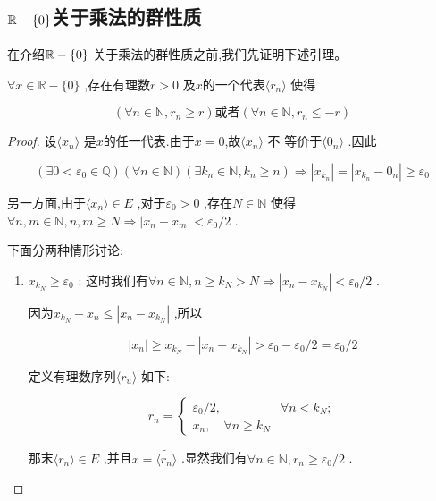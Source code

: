 \subsection{$\mathbb{R}-\{0\}$关于乘法的群性质}

在介绍\(\mathbb{R} - \{0\}\) 关于乘法的群性质之前,我们先证明下述引理。

\begin{mylemma*}{}

\(\forall x \in \mathbb{R} - \{0\}\) ,存在有理数$r > 0$ 及$x$的一个代表\(\langle r_n \rangle\) 使得

\[(\forall n \in \mathbb{N}, r_n \geqslant r) \text{或者} (\forall n \in \mathbb{N}, r_n \leqslant -r)\]

\end{mylemma*}


\begin{proof}

设\(\langle x_n \rangle\) 是$x$的任一代表.由于$x = 0$,故\(\langle x_n \rangle\) 不 等价于\(\langle 0_n \rangle\) .因此

\[(\exists 0 < \varepsilon_0 \in \mathbb{Q}) (\forall n \in \mathbb{N}) (\exists k_n \in \mathbb{N}, k_n \geqslant n) \Longrightarrow |x_{k_n}| = |x_{k_n} - 0_n| \geq \varepsilon_0 \]

另一方面,由于\(\langle x_n \rangle \in E\) ,对于\(\varepsilon_0 > 0\) ,存在\(N \in \mathbb{N}\) 使得\(\forall n, m \in \mathbb{N}, n, m \geqslant N \Longrightarrow |x_n - x_m| < \varepsilon_0 / 2\) .

下面分两种情形讨论:

\begin{enumerate}[label=\arabic*)]

\item \(x_{k_N} \geqslant \varepsilon_0\) : 这时我们有\(\forall n \in \mathbb{N}, n \geqslant k_N > N \Longrightarrow |x_n - x_{k_N}| < \varepsilon_0/2\) .

因为\(x_{k_N} - x_n \leqslant |x_n - x_{k_N}|\) ,所以

\[|x_n| \ge x_{k_N} - |x_n - x_{k_N}| > \varepsilon_0 - \varepsilon_0/2 = \varepsilon_0/2\]

定义有理数序列\(\langle r_u \rangle\) 如下:


\[r_n = \begin{cases} \varepsilon_0/2, & \forall n < k_N; \\ x_n, \quad  \forall n \geqslant k_N \end{cases}\]

那末\(\langle r_n \rangle \in E\) ,并且\(x = \widetilde{\langle r_n \rangle}\) .显然我们有\(\forall n \in \mathbb{N}, r_n \geq \varepsilon_0/2\) .


\end{enumerate}
\end{proof}
